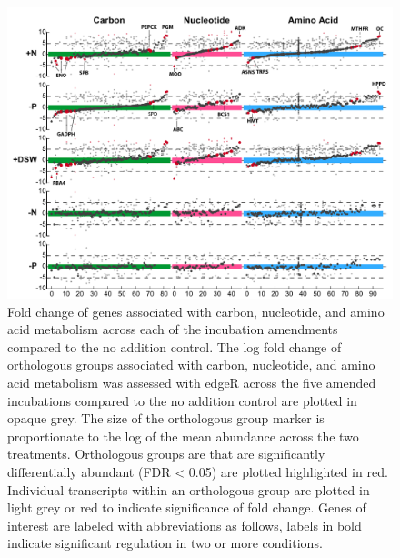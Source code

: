 \begin{figure}[p!]

  \centering
  \includegraphics[width=1\textwidth]{Images/C6_FigureS6_MckewCarbon.pdf}
    \caption[Fold change of genes associated with carbon, nucleotide, and amino acid metabolism across each of the incubation amendments]{Fold change of genes associated with carbon, nucleotide, and amino acid metabolism across each of the incubation amendments compared to the no addition control. The log fold change of orthologous groups associated with carbon, nucleotide, and amino acid metabolism was assessed with edgeR across the five amended incubations compared to the no addition control are plotted in opaque grey. The size of the orthologous group marker is proportionate to the log of the mean abundance across the two treatments. Orthologous groups are that are significantly differentially abundant (FDR < 0.05) are plotted highlighted in red. Individual transcripts within an orthologous group are plotted in light grey or red to indicate significance of fold change. Genes of interest are labeled with abbreviations as follows, labels in bold indicate significant regulation in two or more conditions. }
    \label{fig:a5f6}
\end{figure}


